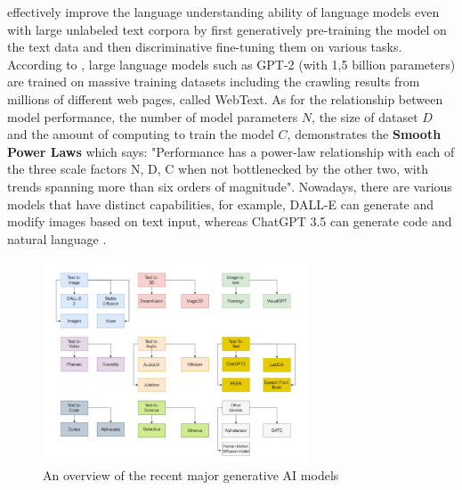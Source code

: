 \documentclass[runningheads]{llncs}
\begin{document}
effectively improve the language understanding ability of language models even with large unlabeled text corpora by first generatively pre-training the model on the text data and then discriminative fine-tuning them on various tasks.
According to \cite{Radford19}, large language models such as GPT-2 (with 1,5 billion parameters) are trained on massive training datasets including the crawling results from millions of different web pages, called WebText.
As for the relationship between model performance, the number of model parameters $N$, the size of dataset $D$ and the amount of computing to train the model $C$, \cite{Kaplan20} demonstrates the \textbf{Smooth Power Laws} which says:
"Performance has a power-law relationship with each of the three scale factors N, D, C when not bottlenecked by the other two, with trends spanning more than six orders of magnitude". Nowadays, there are various models
that have distinct capabilities, for example, DALL-E can generate and modify images based on text input, whereas ChatGPT 3.5 can generate code and natural language \cite{Gozalo23}.
\noindent \newline
\begin{figure}[]
  \centering
  \includegraphics[width=0.7\textwidth]{models overview.png}
  \caption{An overview of the recent major generative AI models  \cite{Gozalo23}}
  \label{fig:model_overview}
\end{figure}
\end{document}
